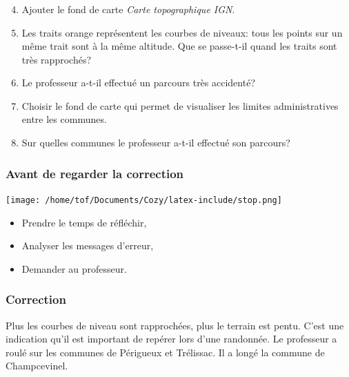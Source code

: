 \documentclass[svgnames,11pt]{beamer}
\begin{document}
\begin{frame}
    \frametitle{}
\setcounter{compteuractivite}{2}
    \begin{activite}
    \begin{enumerate}
        \setcounter{enumi}{3}
        \item Ajouter le fond de carte \emph{Carte topographique IGN}.
    \item Les traits orange représentent les courbes de niveaux: tous les points sur un même trait sont à la même altitude. Que se passe-t-il quand les traits sont très rapprochés?
    \item Le professeur a-t-il effectué un parcours très accidenté?
    \item Choisir le fond de carte qui permet de visualiser les limites administratives entre les communes.
    \item Sur quelles communes le professeur a-t-il effectué son parcours?
    \end{enumerate}
    \end{activite}

\end{frame}
\begin{frame}
    \frametitle{Avant de regarder la correction}
\begin{center}
    \centering
    \texttt{[image: /home/tof/Documents/Cozy/latex-include/stop.png]}
    \end{center}
{\Large
    \begin{itemize}
        \item Prendre le temps de réfléchir,
        \item Analyser les messages d'erreur,
        \item Demander au professeur.
    \end{itemize}
}
\end{frame}
\begin{frame}
    \frametitle{Correction}

    Plus les courbes de niveau sont rapprochées, plus le terrain est pentu. C'est une indication qu'il est important de repérer lors d'une randonnée. Le professeur a roulé sur les communes de Périgueux et Trélissac. Il a longé la commune de Champcevinel.

\end{frame}
\end{document}
